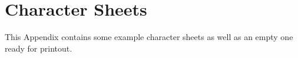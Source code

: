 \chapter{Character Sheets}\label{app:character-sheets}
This Appendix contains some example character sheets as well as an empty one ready for printout.

